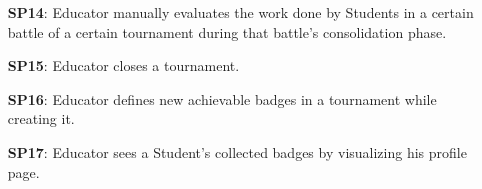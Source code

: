 \documentclass{article}
\begin{document}
\begin{itemize}
\begin{enumerate}
\begin{enumerate}
                        \item[\textbf{SP14}:] Educator manually evaluates the work done by Students in a certain battle of a certain tournament during
                         that battle's consolidation phase.
                        \item[\textbf{SP15}:] Educator closes a tournament.
                        \item[\textbf{SP16}:] Educator defines new achievable badges in a tournament while creating it.
                        \item[\textbf{SP17}:] Educator sees a Student's collected badges by visualizing his profile page.
                    \end{enumerate}
          \end{enumerate}


\end{itemize}
\end{document}
